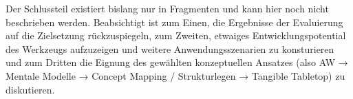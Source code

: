 \todo Der Schlussteil existiert bislang nur in Fragmenten und kann hier noch nicht beschrieben werden. Beabsichtigt ist zum Einen, die Ergebnisse der Evaluierung auf die Zielsetzung rückzuspiegeln, zum Zweiten, etwaiges Entwicklungspotential des Werkzeugs aufzuzeigen und weitere Anwendungsszenarien zu konsturieren und zum Dritten die Eignung des gewählten konzeptuellen Ansatzes (also AW → Mentale Modelle → Concept Mapping / Strukturlegen → Tangible Tabletop) zu diskutieren.
